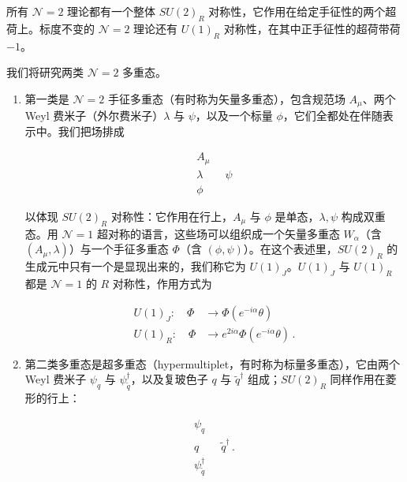 \documentclass[11pt,a4paper,UTF8,fontset=fandol]{ctexart}
\theoremstyle{plain}
\theoremstyle{definition}
\begin{document}
所有 $\mathcal N=2$ 理论都有一个整体 $SU(2)_R$ 对称性，它作用在给定手征性的两个超荷上。标度不变的 $\mathcal N=2$ 理论还有 $U(1)_R$ 对称性，在其中正手征性的超荷带荷 $-1$。

我们将研究两类 $\mathcal N=2$ 多重态。

\begin{enumerate}
\item 第一类是 $\mathcal N=2$ 手征多重态（有时称为矢量多重态），包含规范场 $A_\mu$、两个 Weyl 费米子（外尔费米子）$\lambda$ 与 $\psi$，以及一个标量 $\phi$，它们全都处在伴随表示中。我们把场排成

\begin{equation}
\begin{gathered}
A_\mu\\[2pt]
\lambda\qquad\psi\\[2pt]
\phi
\end{gathered}\tag{2.1}
\end{equation}

以体现 $SU(2)_R$ 对称性：它作用在行上，$A_\mu$ 与 $\phi$ 是单态，$\lambda,\psi$ 构成双重态。用 $\mathcal N=1$ 超对称的语言，这些场可以组织成一个矢量多重态 $W_\alpha$（含 $(A_\mu,\lambda)$）与一个手征多重态 $\Phi$（含 $(\phi,\psi)$）。在这个表述里，$SU(2)_R$ 的生成元中只有一个是显现出来的，我们称它为 $U(1)_J$。$U(1)_J$ 与 $U(1)_R$ 都是 $\mathcal N=1$ 的 $R$ 对称性，作用方式为

\begin{equation}
\begin{aligned}
U(1)_J:\quad \Phi &\to \Phi(e^{-i\alpha}\theta)\\[2pt]
U(1)_R:\quad \Phi &\to e^{2i\alpha}\Phi(e^{-i\alpha}\theta)\,.
\end{aligned}\tag{2.2}
\end{equation}


\item 第二类多重态是超多重态（hypermultiplet，有时称为标量多重态），它由两个 Weyl 费米子 $\psi_q$ 与 $\psi^\dagger_{\tilde q}$，以及复玻色子 $q$ 与 $\tilde q^\dagger$ 组成；$SU(2)_R$ 同样作用在菱形的行上：

\begin{equation}
\begin{gathered}
\psi_q\\[2pt]
q\qquad\tilde q^\dagger\,.\\[2pt]
\psi^\dagger_{\tilde q}
\end{gathered}\tag{2.3}
\end{equation}


\end{enumerate}
\end{document}
